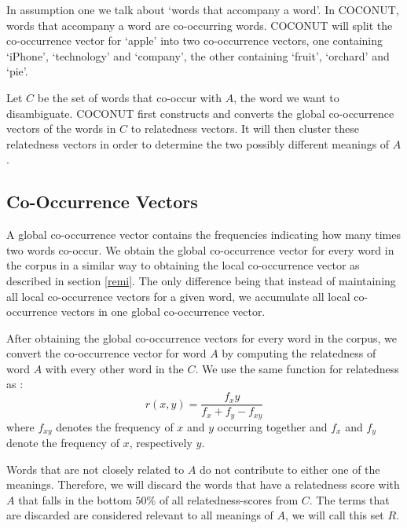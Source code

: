 \documentclass[11pt]{article}
\begin{document}
In assumption one we talk about `words that accompany a word'. In COCONUT, words that accompany a word are co-occurring words. COCONUT will split the co-occurrence vector for `apple' into two co-occurrence vectors, one containing `iPhone', `technology' and `company', the other containing `fruit', `orchard' and `pie'. 

Let $C$ be the set of words that co-occur with $A$, the word we want to disambiguate. COCONUT first constructs and converts the global co-occurrence vectors of the words in $C$ to relatedness vectors. It will then cluster these relatedness vectors in order to determine the two possibly different meanings of $A$. 

\subsection{Co-Occurrence Vectors}
A global co-occurrence vector contains the frequencies indicating how many times two words co-occur. We obtain the global co-occurrence vector for every word in the corpus in a similar way to obtaining the local co-occurrence vector as described in section \ref{remi}. The only difference being that instead of maintaining all local co-occurrence vectors for a given word, we accumulate all local co-occurrence vectors in one global co-occurrence vector. 

After obtaining the global co-occurrence vectors for every word in the corpus, we convert the co-occurrence vector for word $A$ by computing the relatedness of word $A$ with every other word in the $C$. We use the same function for relatedness as \cite{Guthrie:92}:
$$r(x, y) = \frac{f_xy}{f_x+f_y - f_{xy}}$$
where $f_{xy}$ denotes the frequency of $x$ and $y$ occurring together and $f_x$ and $f_y$ denote the frequency of $x$, respectively $y$. 

Words that are not closely related to $A$ do not contribute to either one of the meanings. Therefore, we will discard the words that have a relatedness score with $A$ that falls in the bottom $50\%$ of all relatedness-scores from $C$. The terms that are discarded are considered relevant to all meanings of $A$, we will call this set $R$.
\end{document}
